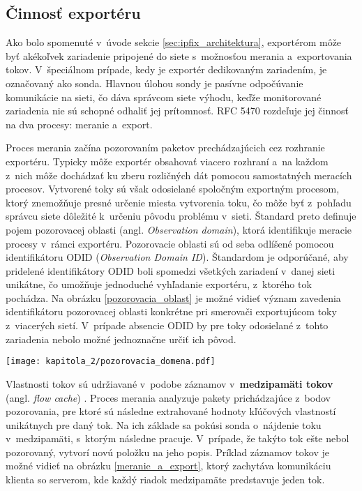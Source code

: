 \subsection*{Činnosť exportéru}

Ako bolo spomenuté v~úvode sekcie \ref{sec:ipfix_architektura}, exportérom môže byť akékoľvek zariadenie pripojené do siete s~možnosťou merania a~exportovania tokov. V~špeciálnom prípade, kedy je exportér dedikovaným zariadením, je označovaný ako sonda.
Hlavnou úlohou sondy je pasívne odpočúvanie komunikácie na sieti, čo dáva správcom siete výhodu, keďže monitorované zariadenia nie sú schopné odhaliť jej prítomnosť. RFC 5470 \cite{rfc5470} rozdeľuje jej činnosť na dva procesy: meranie a~export.

Proces merania začína pozorovaním paketov prechádzajúcich cez rozhranie exportéru. Typicky môže exportér obsahovať viacero rozhraní a~na každom z~nich môže dochádzať ku zberu rozličných dát pomocou samostatných meracích procesov. Vytvorené toky sú však odosielané spoločným
exportným procesom, ktorý znemožňuje presné určenie miesta vytvorenia toku, čo môže byť z~pohľadu správcu siete dôležité k~určeniu pôvodu problému v~sieti. Štandard preto definuje pojem pozorovacej oblasti (angl. \textit{Observation domain}), ktorá identifikuje meracie procesy
v~rámci exportéru. Pozorovacie oblasti sú od seba odlíšené pomocou identifikátoru ODID (\textit{Observation Domain ID}). Štandardom je odporúčané, aby pridelené identifikátory ODID boli spomedzi všetkých zariadení v~danej sieti unikátne, čo umožňuje jednoduché vyhľadanie
exportéru, z~ktorého tok pochádza. Na obrázku \ref{pozorovacia_oblast} je možné vidieť význam zavedenia identifikátoru pozorovacej oblasti konkrétne pri smerovači exportujúcom toky z~viacerých sietí. V~prípade absencie ODID by pre toky odosielané z~tohto zariadenia nebolo
možné jednoznačne určiť ich pôvod.

\begin{figure*}[ht]
    \centering
    \texttt{[image: kapitola\_2/pozorovacia\_domena.pdf]}
    \caption{Príklady pozorovacích oblastí architektúry NetFlow/IPFIX}
    \label{pozorovacia_oblast}
\end{figure*}

Vlastnosti tokov sú udržiavané v~podobe záznamov v~\textbf{medzipamäti tokov} (angl. \textit{flow cache}) \cite{ipfix_architektura}. Proces merania analyzuje pakety prichádzajúce z~bodov pozorovania, pre ktoré sú následne extrahované hodnoty kľúčových vlastností unikátnych pre
daný tok. Na ich základe sa pokúsi sonda o~nájdenie toku v~medzipamäti, s~ktorým následne pracuje. V~prípade, že takýto tok ešte nebol pozorovaný, vytvorí novú položku na jeho popis. Príklad záznamov tokov je možné vidieť na obrázku \ref{meranie_a_export}, ktorý zachytáva
komunikáciu klienta so serverom, kde každý riadok medzipamäte predstavuje jeden tok.

